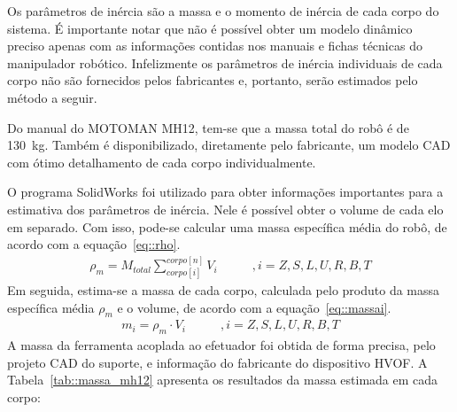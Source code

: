 Os parâmetros de inércia são a massa e o momento de inércia de cada corpo do
sistema. É importante notar que não é possível obter um modelo dinâmico preciso
apenas com as informações contidas nos manuais e fichas técnicas do manipulador
robótico. Infelizmente os parâmetros de inércia individuais de cada corpo não
são fornecidos pelos fabricantes e, portanto, serão estimados pelo método a
seguir.

Do manual do MOTOMAN MH12, tem-se que a massa
total do robô é de 130~kg. Também é disponibilizado, diretamente pelo
fabricante, um modelo CAD com ótimo detalhamento de cada corpo individualmente.

O programa SolidWorks foi utilizado para obter informações importantes para a
estimativa dos parâmetros de inércia. Nele é possível obter o volume de cada elo
em separado. Com isso, pode-se calcular uma massa específica média do robô, de
acordo com a equação~\ref{eq::rho}.
\begin{align}
	\rho_{m} = M_{total}\sum_{corpo[i]}^{corpo[n]} V_{i} \label{eq::rho} \qquad & ,
	i = Z,S,L,U,R,B,T
\end{align}
%
Em seguida, estima-se a massa de cada corpo, calculada pelo produto da massa
específica média $\rho_{m}$ e o volume, de acordo com a
equação~\ref{eq::massai}.
%
\begin{align}
	m_{i} = \rho_{m} \cdot V_{i} \label{eq::massai} \qquad &, i =
	Z,S,L,U,R,B,T
\end{align}
%
A massa da ferramenta acoplada ao efetuador foi obtida de forma precisa,
pelo projeto CAD do suporte, e informação do fabricante do dispositivo
HVOF.
A Tabela~\ref{tab::massa_mh12} apresenta os resultados da massa estimada em cada
corpo:
%
